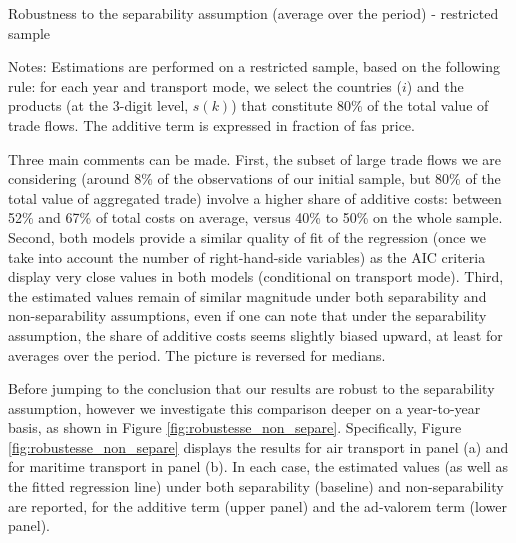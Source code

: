 \documentclass[a4paper,11pt]{article}
\begin{document}
\begin{table}[htbp]
	\centering
	\caption{Robustness to the separability assumption (average over the period) - restricted sample}
	\begin{center}
			
	\end{center}
	\parbox[l]{12cm}{\footnotesize{Notes: Estimations are performed on a restricted sample, based on the following rule: for each year and transport mode, we select the countries ($i$) and the products (at the 3-digit level, $s(k)$) that constitute 80\% of the total value of trade flows.
			The additive term is expressed in fraction of fas price.}}
	\label{tab:robustness_separability}
\end{table}

Three main comments can be made. First, the subset of large trade flows we are considering (around 8\% of the observations of our initial sample, but 80\% of the total value of aggregated trade) involve a higher share of additive costs: between 52\% and 67\% of total costs on average, versus 40\% to 50\% on the whole sample.
Second, both models provide a similar quality of fit of the regression (once we take into account the number of right-hand-side variables) as the AIC criteria display very close values in both models (conditional on transport mode).
Third, the estimated values remain of similar magnitude under both separability and non-separability assumptions, even if one can note that under the separability assumption, the share of additive costs seems slightly biased upward, at least for averages over the period. The picture is reversed for medians.


Before jumping to the conclusion that our results are robust to the separability assumption, however we investigate this comparison deeper on a year-to-year basis, as shown in Figure \ref{fig:robustesse_non_separe}. Specifically, Figure \ref{fig:robustesse_non_separe} displays the results for air transport in panel (a) and for maritime transport in panel (b). In each case, the estimated values (as well as the fitted regression line) under both separability (baseline) and non-separability are reported, for the additive term (upper panel) and the ad-valorem term (lower panel).
\end{document}
